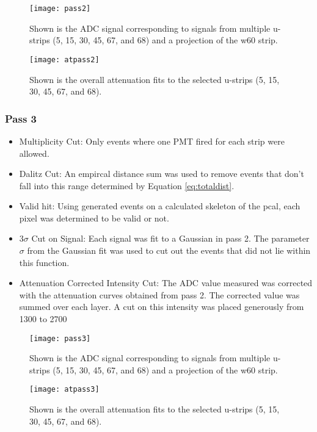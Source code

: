 \begin{figure}[h]
    \centering
    \texttt{[image: pass2]}
    \caption{Shown is the ADC signal corresponding to signals from multiple u-strips (5, 15, 30, 45, 67, and 68) and a projection of the w60 strip.}
    \label{fig:pass2}
\end{figure}

\begin{figure}[h]
    \centering
    \texttt{[image: atpass2]}
    \caption{Shown is the overall attenuation fits to the selected u-strips (5, 15, 30, 45, 67, and 68).}
    \label{fig:atpass2}
\end{figure}



\clearpage
\FloatBarrier
\subsubsection{Pass 3}
\begin{itemize}
    \item Multiplicity Cut: Only events where one PMT fired for each strip were allowed.
    \item Dalitz Cut: An empircal distance sum was used to remove events that don't fall into this range determined by Equation \ref{eq:totaldist}.
    \item Valid hit: Using generated events on a calculated skeleton of the pcal, each pixel was determined to be valid or not.
    \item 3$\sigma$ Cut on Signal: Each signal was fit to a Gaussian in pass 2. The parameter $\sigma$ from the Gaussian fit was used to cut out the events that did not lie within this function.
    \item Attenuation Corrected Intensity Cut: The ADC value measured was corrected with the attenuation curves obtained from pass 2. The corrected value was summed over each layer. A cut on this intensity was placed generously from 1300 to 2700
\end{itemize}

\begin{figure}[h]
    \centering
    \texttt{[image: pass3]}
    \caption{Shown is the ADC signal corresponding to signals from multiple u-strips (5, 15, 30, 45, 67, and 68) and a projection of the w60 strip.}
    \label{fig:pass3}
\end{figure}

\begin{figure}[h]
    \centering
    \texttt{[image: atpass3]}
    \caption{Shown is the overall attenuation fits to the selected u-strips (5, 15, 30, 45, 67, and 68).}
    \label{fig:atpass3}
\end{figure}

